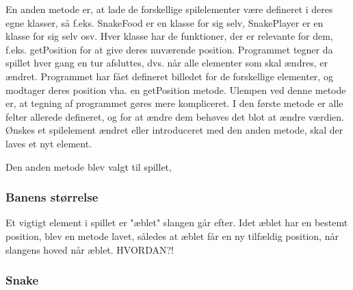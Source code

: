 \documentclass{report}
\begin{document}
En anden metode er, at lade de forskellige spilelementer være defineret i deres egne klasser, så f.eks. SnakeFood er en klasse for sig selv, SnakePlayer er en klasse for sig selv osv. Hver klasse har de funktioner, der er relevante for dem, f.eks. getPosition for at give deres nuværende position. Programmet tegner da spillet hver gang en tur afsluttes, dvs. når alle elementer som skal ændres, er ændret. Programmet har fået defineret billedet for de forskellige elementer, og modtager deres position vha. en getPosition metode.
 Ulempen ved denne metode er, at tegning af programmet gøres mere kompliceret. I den første metode er alle felter allerede defineret, og for at ændre dem behøves det blot at ændre værdien. Ønskes et spilelement ændret eller introduceret med den anden metode, skal der laves et nyt element.
 
Den anden metode blev valgt til spillet,

\subsubsection{Banens størrelse}

Et vigtigt element i spillet er "æblet" slangen går efter. Idet æblet har en bestemt position, blev en metode lavet, således at æblet får en ny tilfældig position, når slangens hoved når æblet. HVORDAN?!

\subsubsection{Snake}
\end{document}
